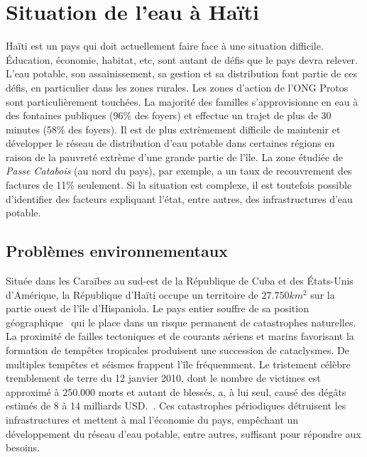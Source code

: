 \documentclass{EPL-master-thesis-covers-FR}
\begin{document}
		\section{Situation de l'eau à Haïti}
			\label{sec:situation}


			Haïti est un pays qui doit actuellement faire face à une situation difficile. \'Education, économie, habitat, etc, sont autant de défis que le pays devra relever. L'eau potable, son assainissement, sa gestion et sa distribution font partie de ces défis, en particulier dans les zones rurales. Les zones d'action de l'ONG Protos sont particulièrement touchées. La majorité des familles s'approvisionne en eau à des fontaines publiques (96\% des foyers) et effectue un trajet de plus de 30 minutes (58\% des foyers). Il est de plus extrèmement difficile de maintenir et développer le réseau de distribution d'eau potable dans certaines régions en raison de la pauvreté extrème d'une grande partie de l'île. La zone étudiée de \emph{Passe Catabois} (au nord du pays), par exemple, a un taux de recouvrement des factures de 11\% seulement. Si la situation est complexe, il est toutefois possible d'identifier des facteurs expliquant l'état, entre autres, des infrastructures d'eau potable.


			\subsection*{Problèmes environnementaux}

				Située dans les Caraïbes au sud-est de la République de Cuba et des \'Etats-Unis d'Amérique, la République d'Haïti occupe un territoire de $27.750km^{2}$ sur la partie ouest de l'île d'Hispaniola. Le pays entier souffre de sa position géographique~\cite{ref:regards_situation_eau_haiti} qui le place dans un risque permanent de catastrophes naturelles. La proximité de failles tectoniques et de courants aériens et marins favorisant la formation de tempêtes tropicales produisent une succession de cataclysmes. De multiples tempêtes et séismes frappent l'île fréquemment. Le tristement célèbre tremblement de terre du 12 janvier 2010, dont le nombre de victimes est approximé à $250.000$ morts et autant de blessés, a, à lui seul, causé des dégâts estimés de 8 à 14 milliards USD.~\cite{ref:estimating_economic_damage_earthquake_haiti}. Ces catastrophes périodiques détruisent les infrastructures et mettent à mal l'économie du pays, empêchant un développement du réseau d'eau potable, entre autres, suffisant pour répondre aux besoins.
\end{document}
